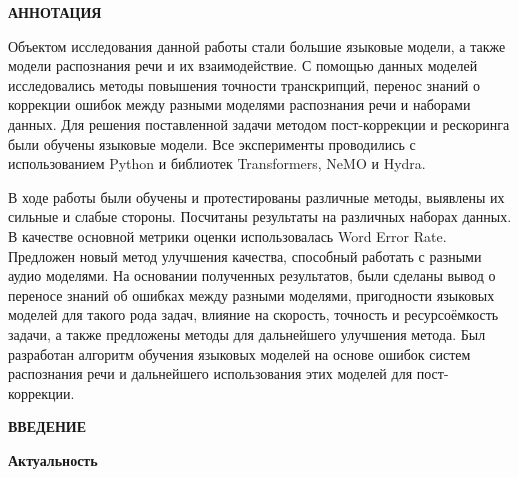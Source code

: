 \newpage
\begin{center}
  \textbf{\large АННОТАЦИЯ}
\end{center}


Объектом исследования данной работы стали большие языковые модели, а также модели распознания речи и их взаимодействие.
С помощью данных моделей исследовались методы повышения точности транскрипций, перенос знаний о коррекции ошибок между разными моделями распознания речи и наборами данных.
Для решения поставленной задачи методом пост-коррекции и рескоринга были обучены языковые модели.
Все эксперименты проводились с использованием Python и библиотек Transformers, NeMO и Hydra.

В ходе работы были обучены и протестированы различные методы, выявлены их сильные и слабые стороны.
Посчитаны результаты на различных наборах данных.
В качестве основной метрики оценки использовалась Word Error Rate.
Предложен новый метод улучшения качества, способный работать с разными аудио моделями.
На основании полученных результатов, были сделаны вывод о переносе знаний об ошибках между разными моделями, пригодности языковых моделей для такого рода задач, влияние на скорость, точность и ресурсоёмкость задачи, а также предложены методы для дальнейшего улучшения метода.
Был разработан алгоритм обучения языковых моделей на основе ошибок систем распознания речи и дальнейшего использования этих моделей для пост-коррекции.

\onehalfspacing
\setcounter{page}{2}

\newpage
\renewcommand{\contentsname}{\centerline{\large СОДЕРЖАНИЕ}}
\tableofcontents

\newpage
\begin{center}
  \textbf{\large ВВЕДЕНИЕ}
\end{center}


\textbf{Актуальность}

